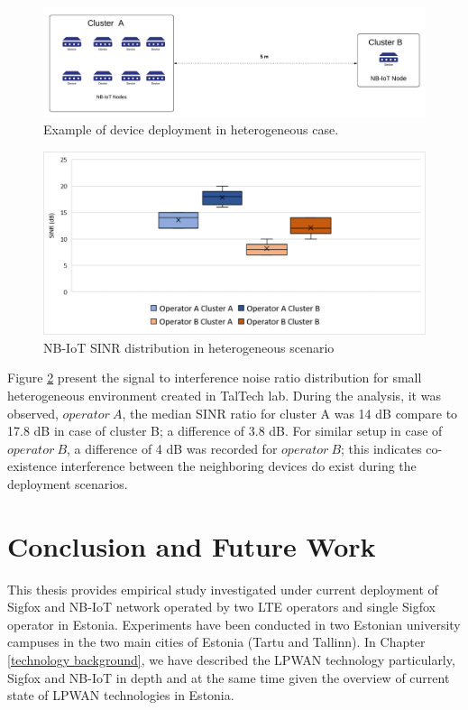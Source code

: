 \documentclass[12pt]{article}
\begin{document}
\begin{figure}[h!]
    \centering
    \includegraphics[width=0.8\linewidth]{Images/hetrogenousCase.pdf}
    \caption{Example of device deployment in heterogeneous case.}
    \label{fig:Example of device deployment in heterogeneous case}
\end{figure}
\begin{figure}[h]
    \centering
    \includegraphics[width=.8\linewidth]{Images/SINRBoxplot.pdf}
    \caption{NB-IoT SINR distribution in heterogeneous scenario}
    \label{fig:SINR distribution}
\end{figure}

Figure \ref{fig:SINR distribution} present the signal to interference noise ratio distribution for small heterogeneous environment created in TalTech lab. During the analysis, it was observed, $operator\ A$, the median SINR ratio for cluster A was 14 dB compare to 17.8 dB in case of cluster B; a difference of 3.8 dB. For similar setup in case of $operator\ B$, a difference of 4 dB was recorded for $operator\ B$; this indicates co-existence interference between the neighboring devices do exist during the deployment scenarios.



\newpage
\section{Conclusion and Future Work} \label{conclusion}
This thesis provides empirical study investigated under current deployment of Sigfox and NB-IoT network operated by two LTE operators and single Sigfox operator in Estonia. Experiments have been conducted in two Estonian university campuses in the two main cities of Estonia (Tartu and Tallinn). In Chapter \ref{technology background}, we have described the LPWAN technology particularly, Sigfox and NB-IoT in depth and at the same time given the overview of current state of LPWAN technologies in Estonia.\par
\end{document}
